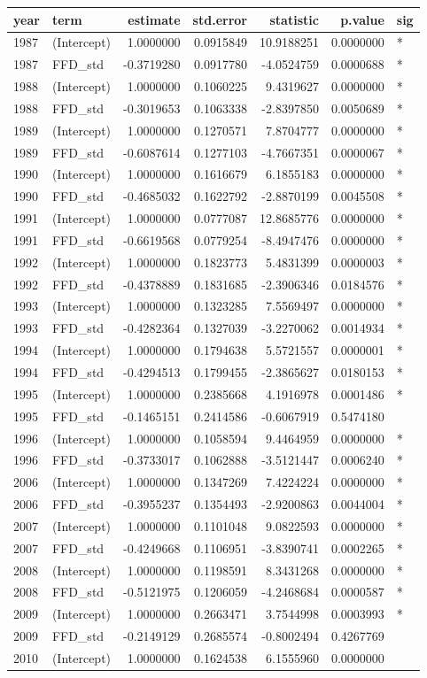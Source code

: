 \documentclass[]{article}
\begin{document}
\begin{longtable}[]{@{}llrrrrl@{}}
\toprule
year & term & estimate & std.error & statistic & p.value &
sig\tabularnewline
\midrule
\endhead
1987 & (Intercept) & 1.0000000 & 0.0915849 & 10.9188251 & 0.0000000 &
*\tabularnewline
1987 & FFD\_std & -0.3719280 & 0.0917780 & -4.0524759 & 0.0000688 &
*\tabularnewline
1988 & (Intercept) & 1.0000000 & 0.1060225 & 9.4319627 & 0.0000000 &
*\tabularnewline
1988 & FFD\_std & -0.3019653 & 0.1063338 & -2.8397850 & 0.0050689 &
*\tabularnewline
1989 & (Intercept) & 1.0000000 & 0.1270571 & 7.8704777 & 0.0000000 &
*\tabularnewline
1989 & FFD\_std & -0.6087614 & 0.1277103 & -4.7667351 & 0.0000067 &
*\tabularnewline
1990 & (Intercept) & 1.0000000 & 0.1616679 & 6.1855183 & 0.0000000 &
*\tabularnewline
1990 & FFD\_std & -0.4685032 & 0.1622792 & -2.8870199 & 0.0045508 &
*\tabularnewline
1991 & (Intercept) & 1.0000000 & 0.0777087 & 12.8685776 & 0.0000000 &
*\tabularnewline
1991 & FFD\_std & -0.6619568 & 0.0779254 & -8.4947476 & 0.0000000 &
*\tabularnewline
1992 & (Intercept) & 1.0000000 & 0.1823773 & 5.4831399 & 0.0000003 &
*\tabularnewline
1992 & FFD\_std & -0.4378889 & 0.1831685 & -2.3906346 & 0.0184576 &
*\tabularnewline
1993 & (Intercept) & 1.0000000 & 0.1323285 & 7.5569497 & 0.0000000 &
*\tabularnewline
1993 & FFD\_std & -0.4282364 & 0.1327039 & -3.2270062 & 0.0014934 &
*\tabularnewline
1994 & (Intercept) & 1.0000000 & 0.1794638 & 5.5721557 & 0.0000001 &
*\tabularnewline
1994 & FFD\_std & -0.4294513 & 0.1799455 & -2.3865627 & 0.0180153 &
*\tabularnewline
1995 & (Intercept) & 1.0000000 & 0.2385668 & 4.1916978 & 0.0001486 &
*\tabularnewline
1995 & FFD\_std & -0.1465151 & 0.2414586 & -0.6067919 & 0.5474180
&\tabularnewline
1996 & (Intercept) & 1.0000000 & 0.1058594 & 9.4464959 & 0.0000000 &
*\tabularnewline
1996 & FFD\_std & -0.3733017 & 0.1062888 & -3.5121447 & 0.0006240 &
*\tabularnewline
2006 & (Intercept) & 1.0000000 & 0.1347269 & 7.4224224 & 0.0000000 &
*\tabularnewline
2006 & FFD\_std & -0.3955237 & 0.1354493 & -2.9200863 & 0.0044004 &
*\tabularnewline
2007 & (Intercept) & 1.0000000 & 0.1101048 & 9.0822593 & 0.0000000 &
*\tabularnewline
2007 & FFD\_std & -0.4249668 & 0.1106951 & -3.8390741 & 0.0002265 &
*\tabularnewline
2008 & (Intercept) & 1.0000000 & 0.1198591 & 8.3431268 & 0.0000000 &
*\tabularnewline
2008 & FFD\_std & -0.5121975 & 0.1206059 & -4.2468684 & 0.0000587 &
*\tabularnewline
2009 & (Intercept) & 1.0000000 & 0.2663471 & 3.7544998 & 0.0003993 &
*\tabularnewline
2009 & FFD\_std & -0.2149129 & 0.2685574 & -0.8002494 & 0.4267769
&\tabularnewline
2010 & (Intercept) & 1.0000000 & 0.1624538 & 6.1555960 & 0.0000000 &

\end{longtable}
\end{document}
